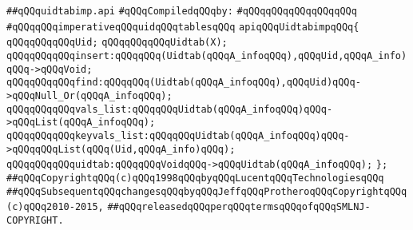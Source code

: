 \label{src/lib/c-kit/src/ast/uidtabimp.api}
\verb|##qQQquidtabimp.api|\newline
\newline
\verb|#qQQqCompiledqQQqby:|\newline
\verb|#qQQqqQQqqQQqqQQqqQQq|\newline
\newline
\verb|#qQQqqQQqimperativeqQQquidqQQqtablesqQQq|\newline
\newline
\verb|apiqQQqUidtabimpqQQq{|\newline
\newline
\verb|qQQqqQQqqQQqUid;|\newline
\verb|qQQqqQQqqQQqUidtab(X);|\newline
\newline
\verb|qQQqqQQqqQQqinsert:qQQqqQQq(Uidtab(qQQqA_infoqQQq),qQQqUid,qQQqA_info)qQQq->qQQqVoid;|\newline
\verb|qQQqqQQqqQQqfind:qQQqqQQq(Uidtab(qQQqA_infoqQQq),qQQqUid)qQQq->qQQqNull_Or(qQQqA_infoqQQq);|\newline
\verb|qQQqqQQqqQQqvals_list:qQQqqQQqUidtab(qQQqA_infoqQQq)qQQq->qQQqList(qQQqA_infoqQQq);|\newline
\verb|qQQqqQQqqQQqkeyvals_list:qQQqqQQqUidtab(qQQqA_infoqQQq)qQQq->qQQqqQQqList(qQQq(Uid,qQQqA_info)qQQq);|\newline
\newline
\verb|qQQqqQQqqQQquidtab:qQQqqQQqVoidqQQq->qQQqUidtab(qQQqA_infoqQQq);|\newline
\newline
\verb|};|\newline
\newline
\newline
\newline
\newline
\newline
\verb|##qQQqCopyrightqQQq(c)qQQq1998qQQqbyqQQqLucentqQQqTechnologiesqQQq|\newline
\verb|##qQQqSubsequentqQQqchangesqQQqbyqQQqJeffqQQqProtheroqQQqCopyrightqQQq(c)qQQq2010-2015,|\newline
\verb|##qQQqreleasedqQQqperqQQqtermsqQQqofqQQqSMLNJ-COPYRIGHT.|\newline

